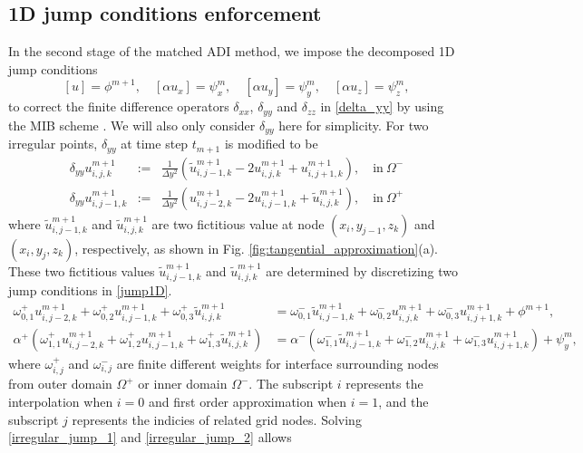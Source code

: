 \documentclass[dissertation]{uathesis}
\begin{document}
\begin{body}
\subsection{1D jump conditions enforcement}
In the second stage of the matched ADI method, we impose the decomposed 1D jump conditions
\begin{equation}\label{jump1D}
[u]=\phi^{m+1}, \quad [\alpha u_x]=\psi_x^m, \quad [\alpha u_y]=\psi_y^m, \quad [\alpha u_z]=\psi_z^m, 
\end{equation}
to correct the finite difference operators $\delta_{xx}$, $\delta_{yy}$ and $\delta_{zz}$ in \eqref{delta_yy} by using the MIB scheme
\cite{zhao2004high,zhou2006high,yu2007three,yu2007matched}.
We will also only consider $\delta_{yy}$ here for simplicity. 
For two irregular points, $\delta_{yy}$ at time step $t_{m+1}$ is modified to be 
%
\begin{eqnarray} \label{MIB_delta_yy}
\delta_{yy} u^{m+1}_{i,j,k} &:=& \frac{1}{\Delta y^{2}} (\tilde{u}^{m+1}_{i,j-1,k} - 2 u^{m+1}_{i,j,k} + u^{m+1}_{i,j+1,k}), \quad \mbox{in}~ \Omega^- \nonumber \\
\delta_{yy} u^{m+1}_{i,j-1,k} &:=& \frac{1}{\Delta y^{2}} (u^{m+1}_{i,j-2,k} - 2 u^{m+1}_{i,j-1,k} + \tilde{u}^{m+1}_{i,j,k}), \quad \mbox{in}~ \Omega^+
\end{eqnarray}
%
where $\tilde{u}^{m+1}_{i,j-1,k}$ and $\tilde{u}^{m+1}_{i,j,k}$ are two fictitious value at node $(x_{i},y_{j-1},z_{k})$ and $(x_{i},y_{j},z_{k})$, respectively, as shown in Fig. \ref{fig:tangential_approximation}(a). These two fictitious values $\tilde{u}^{m+1}_{i,j-1,k}$ and $\tilde{u}^{m+1}_{i,j,k}$ are determined by discretizing two jump conditions in \eqref{jump1D}. 
%
\begin{align}
\omega^{+}_{0,1}u^{m+1}_{i,j-2,k}+\omega^{+}_{0,2}u^{m+1}_{i,j-1,k}+\omega^{+}_{0,3}\tilde{u}^{m+1}_{i,j,k}&=\omega^{-}_{0,1}\tilde{u}^{m+1}_{i,j-1,k}+\omega^{-}_{0,2}u^{m+1}_{i,j,k}+\omega^{-}_{0,3}u^{m+1}_{i,j+1,k}+\phi^{m+1}, \label{irregular_jump_1}\\
\alpha^{+}(\omega^{+}_{1,1}u^{m+1}_{i,j-2,k}+\omega^{+}_{1,2}u^{m+1}_{i,j-1,k}+\omega^{+}_{1,3}\tilde{u}^{m+1}_{i,j,k})&=\alpha^{-}(\omega^{-}_{1,1}\tilde{u}^{m+1}_{i,j-1,k}+\omega^{-}_{1,2}u^{m+1}_{i,j,k}+\omega^{-}_{1,3}u^{m+1}_{i,j+1,k})+\psi_{y}^{m}, \label{irregular_jump_2}
\end{align}
%
where $\omega^{+}_{i,j}$ and $\omega^{-}_{i,j}$ are finite different weights \cite{fornberg1998classroom} for interface surrounding nodes from outer domain $\Omega^{+}$ or inner domain $\Omega^{-}$. The subscript $i$ represents the interpolation when $i=0$ and first order approximation when $i=1$, and the subscript $j$ represents the indicies of related grid nodes. Solving \eqref{irregular_jump_1} and \eqref{irregular_jump_2} allows 

\end{body}
\end{document}

